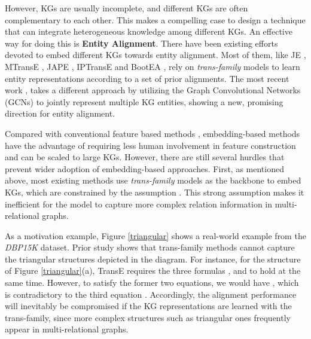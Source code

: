 \documentclass{article}
\begin{document}
However, KGs are usually incomplete, and different KGs are often complementary to each other. This makes a compelling case to design a technique that can integrate heterogeneous knowledge among different KGs. An effective way for doing this is \textbf{Entity Alignment}. 
There have been existing efforts devoted to embed different KGs towards entity alignment. Most of them, like JE \cite{hao2016joint}, MTransE \cite{chen2016multilingual}, JAPE \cite{sun2017cross}, IPTransE \cite{zhu2017iterative} and BootEA \cite{sun2018bootstrapping}, rely on \textit{trans-family} models to learn entity representations according to a set of prior alignments.
The most recent work \cite{wang2018cross}, takes a different approach by utilizing the Graph Convolutional Networks (GCNs) \cite{Kipf2016Semi} to jointly represent multiple KG entities, showing a new, promising direction for entity alignment. 

Compared with conventional feature based methods \cite{crowd2012,mahdisoltani2013yago3}, embedding-based methods have the advantage of requiring less human
involvement in feature construction and can be scaled to large KGs. However, there are still several hurdles that prevent wider adoption of embedding-based approaches. First, as mentioned
above, most existing methods use \textit{trans-family} models as the backbone to embed KGs, which are constrained by the assumption
. This strong assumption makes it inefficient for the model to capture more complex relation information in multi-relational graphs. 

As a motivation example, Figure \ref{triangular} shows a real-world example from the \textit{DBP15K} \cite{sun2017cross} dataset. Prior study \cite{li2018structural} shows that trans-family methods cannot capture the triangular structures depicted in the diagram. 
For instance, for the structure of
Figure \ref{triangular}(a), TransE requires the three formulas ,  and  to
hold at the same time. However, to satisfy the former two equations, we would have , which is contradictory to the third
equation . Accordingly, the alignment performance will inevitably be compromised if the KG representations are
learned with the trans-family, since more complex structures such as triangular ones frequently appear in multi-relational graphs.
\end{document}
